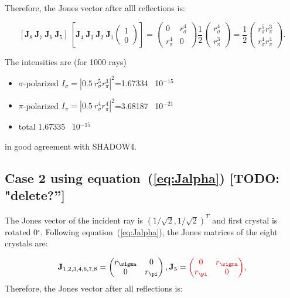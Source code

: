 \documentclass{iucr}
\newcommand{\todo}[1]{{\color{red}[TODO: "#1'']}}
\newcommand{\inred}[1]{{\color{red}#1}}
\begin{document}
Therefore, the Jones vector after alll reflections is:

\begin{equation}\label{eq:JVcase1}
[\textbf{J}_8~\textbf{J}_7~\textbf{J}_6~\textbf{J}_5]~[\textbf{J}_4~\textbf{J}_3~\textbf{J}_2~\textbf{J}_1
    \begin{pmatrix}
    1\\0
    \end{pmatrix}]=
    \begin{pmatrix}
    0 & r_\sigma^4\\
    r_\pi^4 & 0
    \end{pmatrix}
    \frac{1}{2}
    \begin{pmatrix}
    r_\sigma^4\\
    r_\pi^3
    \end{pmatrix}
    = 
\frac{1}{2}
    \begin{pmatrix}
    r_\sigma^5 r_\pi^3\\
    r_\sigma^4 r_\pi^4
    \end{pmatrix}.
\end{equation}

The intensities are (for 1000 rays)
\begin{itemize}
    \item $\sigma$-polarized $I_\sigma=|0.5~r_\sigma^5 r_\pi^3|^2$=1.67334~ 10$^{-15}$
    \item $\pi$-polarized $I_\pi=|0.5~r_\sigma^4 r_\pi^4|^2$=3.68187~ 10$^{-21}$
    \item total 1.67335~ 10$^{-15}$
\end{itemize}
in good agreement with SHADOW4.

\subsection{Case 2 using equation~(\ref{eq:Jalpha}) \todo{delete?}}
The Jones vector of the incident ray is $(1/\sqrt{2},1/\sqrt{2})^T$ and first crystal is rotated 0$^\circ$. Following equation~(\ref{eq:Jalpha}), the Jones matrices of the eight crystals are: 

\begin{equation}\label{eq:Jcase2}
\textbf{J}_{1,2,3,4,6,7,8}=
    \begin{pmatrix}
r_\sigma & 0\\
0& 
r_\pi
\end{pmatrix},
\textbf{J}_{5}=
\inred{
    \begin{pmatrix}
0 & r_\sigma\\ 
r_\pi & 0\end{pmatrix}
}
,
\end{equation}
Therefore, the Jones vector after all reflections is:
\end{document}
